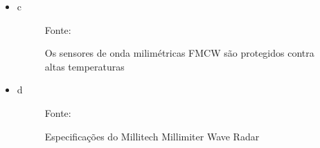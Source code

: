 \documentclass[xcolor=dvipsnames, aspectratio=169]{beamer}
\begin{document}
\begin{frame}
\begin{itemize}
        \item c

        \begin{figure}
            \centering
            {Fonte: \cite{everett1995sensors}}
            \caption{Os sensores de onda milimétricas FMCW são protegidos contra altas temperaturas}
            \label{fig:militech_sensor_}
        \end{figure}
        
        \item d


        \begin{figure}
            \centering
            {Fonte: \cite{everett1995sensors}}
            \caption{Especificações do Millitech Millimiter Wave Radar}
            \label{fig:militech_specs}
        \end{figure}

	\end{itemize}
\end{frame}



\begin{frame}
    \printbibliography
\end{frame}


\begin{frame}
\titlepage %
\end{frame}
\end{document}
